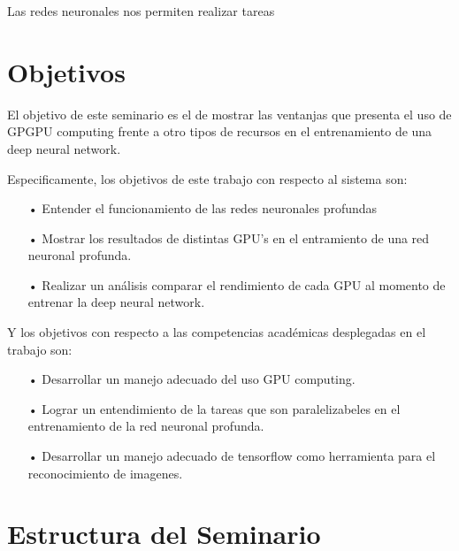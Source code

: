 Las redes neuronales nos permiten realizar tareas 



\section{Objetivos}

El objetivo de este seminario es el de mostrar las ventanjas que presenta el uso de GPGPU computing frente a otro tipos de recursos en el entrenamiento de una deep neural network.

Especificamente, los objetivos de este trabajo con respecto al sistema son:

\begin{itemize}
\item[•] Entender el funcionamiento de las redes neuronales profundas%
\item[•] Mostrar los resultados de distintas GPU's en el entramiento de una red neuronal profunda.%
\item[•] Realizar un análisis comparar el rendimiento de cada GPU al momento de entrenar la deep neural network.%


\end{itemize}

Y los objetivos con respecto a las competencias académicas desplegadas en el trabajo son:
\begin{itemize}
\item[•] Desarrollar un manejo adecuado del uso GPU computing.%
\item[•] Lograr un entendimiento de la tareas que son paralelizabeles en el entrenamiento de la red neuronal profunda.%
\item[•] Desarrollar un manejo adecuado de tensorflow como herramienta para el reconocimiento de imagenes.%

\end{itemize}

\section{Estructura del Seminario}


